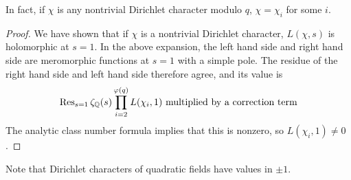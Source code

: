 In fact, if \( \chi \) is any nontrivial Dirichlet character modulo \( q \), \( \chi = \chi_i \) for some \( i \).
\begin{proof}
    We have shown that if \( \chi \) is a nontrivial Dirichlet character, \( L(\chi, s) \) is holomorphic at \( s = 1 \).
    In the above expansion, the left hand side and right hand side are meromorphic functions at \( s = 1 \) with a simple pole.
    The residue of the right hand side and left hand side therefore agree, and its value is
    \[ \Res_{s = 1}\zeta_{\mathbb Q}(s) \prod_{i=2}^{\varphi(q)}L(\chi_i, 1) \text{ multiplied by a correction term} \]
    The analytic class number formula implies that this is nonzero, so \( L(\chi_i, 1) \neq 0 \).
\end{proof}
Note that Dirichlet characters of quadratic fields have values in \( \pm 1 \).

